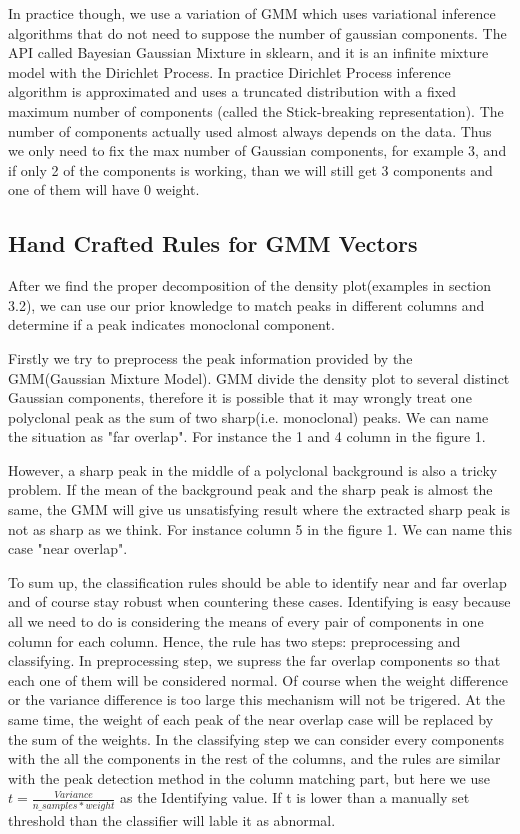 \documentclass[10pt,twocolumn,letterpaper]{article}
\begin{document}
In practice though, we use a variation of GMM which uses variational inference algorithms that do not need to suppose the number of gaussian components. The API called Bayesian Gaussian Mixture in sklearn\cite{scikit-learn}, and it is an infinite mixture model with the Dirichlet Process. In practice Dirichlet Process inference algorithm is approximated and uses a truncated distribution with a fixed maximum number of components (called the Stick-breaking representation). The number of components actually used almost always depends on the data\cite{article}\cite{ATTIAS2000A}. Thus we only need to fix the max number of Gaussian components, for example 3, and if only 2 of the components is working, than we will still get 3 components and one of them will have 0 weight.

\subsection{Hand Crafted Rules for GMM Vectors}
After we find the proper decomposition of the density plot(examples in section 3.2), we can use our prior knowledge to match peaks in different columns and determine if a peak indicates monoclonal component.
\par Firstly we try to preprocess the peak information provided by the GMM(Gaussian Mixture Model). GMM divide the density plot to several distinct Gaussian components, therefore it is possible that it may wrongly treat one polyclonal peak as the sum of two sharp(i.e. monoclonal) peaks. We can name the situation as "far overlap". For instance the 1 and 4 column in the figure 1.
\par However, a sharp peak in the middle of a polyclonal background is also a tricky problem. If the mean of the background peak and the sharp peak is almost the same, the GMM will give us unsatisfying result where the extracted sharp peak is not as sharp as we think. For instance column 5 in the figure 1. We can name this case "near overlap".
\par To sum up, the classification rules should be able to identify near and far overlap and of course stay robust when countering these cases. Identifying is easy because all we need to do is considering the means of every pair of components in one column for each column. Hence, the rule has two steps: preprocessing and classifying. In preprocessing step, we supress the far overlap components so that each one of them will be considered normal. Of course when the weight difference or the variance difference is too large this mechanism will not be trigered. At the same time, the weight of each peak of the near overlap case will be replaced by the sum of the weights. In the classifying step we can consider every components with the all the components in the rest of the columns, and the rules are similar with the peak detection method in the column matching part, but here we use $t=\frac{Variance}{n\_samples*weight}$ as the Identifying value. If t is lower than a manually set threshold than the classifier will lable it as abnormal.
\end{document}
